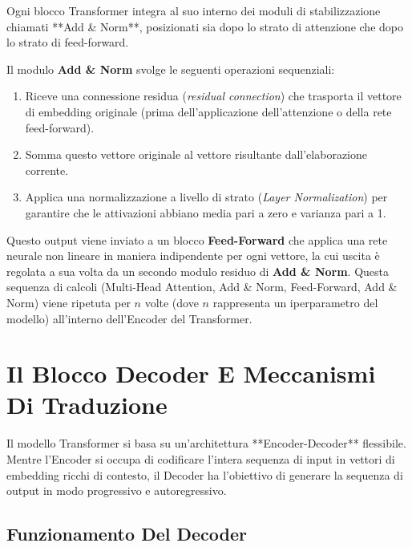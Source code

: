 ﻿\documentclass[11pt, a4paper]{article}
\begin{document}
Ogni blocco Transformer integra al suo interno dei moduli di stabilizzazione chiamati **Add \& Norm**, posizionati sia dopo lo strato di attenzione che dopo lo strato di feed-forward.


Il modulo \textbf{Add \& Norm} svolge le seguenti operazioni sequenziali:
\begin{enumerate}
    \item Riceve una connessione residua (\emph{residual connection}) che trasporta il vettore di embedding originale (prima dell'applicazione dell'attenzione o della rete feed-forward).
    \item Somma questo vettore originale al vettore risultante dall'elaborazione corrente.
    \item Applica una normalizzazione a livello di strato (\emph{Layer Normalization}) per garantire che le attivazioni abbiano media pari a zero e varianza pari a 1.
\end{enumerate}

Questo output viene inviato a un blocco \textbf{Feed-Forward} che applica una rete neurale non lineare in maniera indipendente per ogni vettore, la cui uscita è regolata a sua volta da un secondo modulo residuo di \textbf{Add \& Norm}. Questa sequenza di calcoli (Multi-Head Attention, Add \& Norm, Feed-Forward, Add \& Norm) viene ripetuta per $n$ volte (dove $n$ rappresenta un iperparametro del modello) all'interno dell'Encoder del Transformer.

\newpage

\section{Il Blocco Decoder E Meccanismi Di Traduzione}

Il modello Transformer si basa su un'architettura **Encoder-Decoder** flessibile. Mentre l'Encoder si occupa di codificare l'intera sequenza di input in vettori di embedding ricchi di contesto, il Decoder ha l'obiettivo di generare la sequenza di output in modo progressivo e autoregressivo.


\subsection{Funzionamento Del Decoder}
\end{document}
